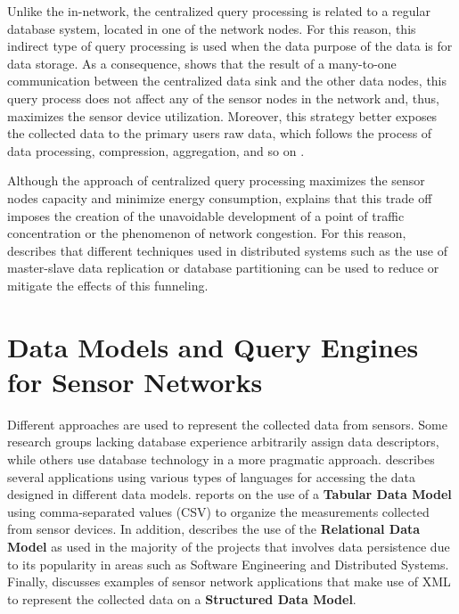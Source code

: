 Unlike the in-network, the centralized query processing is related to a regular
database system, located in one of the network nodes. For this reason, this
indirect type of query processing is used when the data purpose of the data is for 
data storage. As a consequence, \cite{sn-storage02} shows that the result of
a many-to-one communication between the centralized data sink
and the other data nodes, this query process does not affect any of the sensor
nodes in the network and, thus, maximizes the sensor device utilization. 
Moreover, this strategy better exposes the collected data to the primary users
raw data, which follows the process of data processing, compression,
aggregation, and so on \cite{sn-db-modeling02}.

Although the approach of centralized query processing maximizes the sensor
nodes capacity and minimize energy consumption, \cite{sn-storage02} explains
that this trade off imposes the creation of the unavoidable development of a
point of traffic concentration or the phenomenon of network congestion. For
this reason, \cite{sn-storage04} describes that different techniques used in 
distributed systems such as the use of master-slave data replication
\cite{sn-data-center-replication-load-balance} or database partitioning
\cite{db-partitioning-relational} can be used to reduce or mitigate the
effects of this funneling.

\section{Data Models and Query Engines for Sensor Networks}
\label{sec:data-models}

Different approaches are used to represent the collected data from sensors.
Some research groups lacking database experience arbitrarily assign data 
descriptors, while others use database technology in a more pragmatic approach.
\cite{sn-programming-language} describes several applications using
various types of languages for accessing the data designed in different data
models. \cite{sn-provenance} reports on the use of a \textbf{Tabular Data Model}
\cite{tabular-model} using comma-separated values (CSV) to organize the
measurements collected from sensor devices. In addition, \cite{sn-db-tinydb} 
describes the use of the \textbf{Relational Data Model} \cite{relational-model} 
as used in the majority of the projects that involves data persistence due to its
popularity in areas such as Software Engineering and Distributed Systems. Finally,
\cite{sn-xml-usage01, sn-xml-usage02} discusses examples of sensor network 
applications that make use of XML \cite{xml} to represent the collected data on a 
\textbf{Structured Data Model}.


